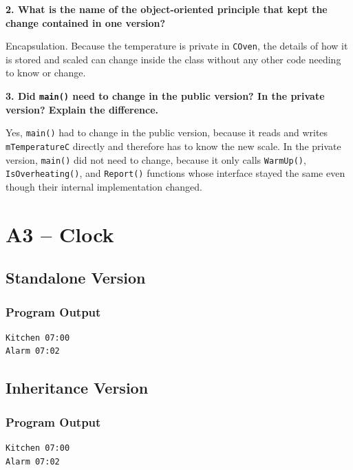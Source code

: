 \documentclass[10pt,a4paper]{article}
\newcommand{\question}[1]{%
    \vspace{5pt}
    \textbf{#1}\par
    \vspace{2pt}
}
\begin{document}
\question{2. What is the name of the object-oriented principle that kept the change contained in one version?}

Encapsulation. Because the temperature is private in \texttt{COven}, the
details of how it is stored and scaled can change inside the class without
any other code needing to know or change.

\question{3. Did \texttt{main()} need to change in the public version? In the private version? Explain the difference.}

Yes, \texttt{main()} had to change in the public version, because it reads
and writes \texttt{mTemperatureC} directly and therefore has to know the
new scale. In the private version, \texttt{main()} did not need to change,
because it only calls \texttt{WarmUp()}, \texttt{IsOverheating()}, and
\texttt{Report()} functions whose interface stayed the same even though
their internal implementation changed.

\newpage
\section{A3 -- Clock}

\subsection{Standalone Version}

\subsubsection{Program Output}

\begin{lstlisting}[style=output]
Kitchen 07:00
Alarm 07:02
\end{lstlisting}

\subsection{Inheritance Version}

\subsubsection{Program Output}

\begin{lstlisting}[style=output]
Kitchen 07:00
Alarm 07:02
\end{lstlisting}
\end{document}
